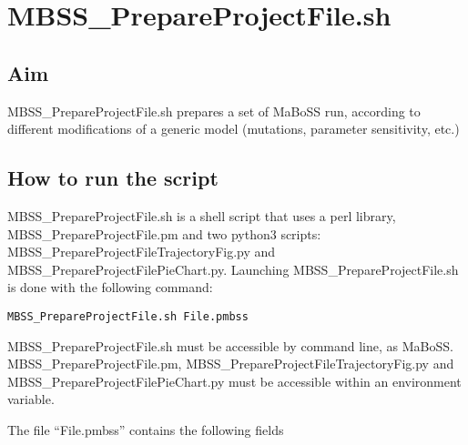 \documentclass{article}
\begin{document}
\section*{MBSS\_PrepareProjectFile.sh}
\subsection*{Aim}
MBSS\_PrepareProjectFile.sh prepares a set of MaBoSS run, according to different modifications of a generic model (mutations, parameter sensitivity, etc.)

\subsection*{How to run the script}
MBSS\_PrepareProjectFile.sh is a shell script that uses a perl library, MBSS\_PrepareProjectFile.pm and two python3 scripts: MBSS\_PrepareProjectFileTrajectoryFig.py and MBSS\_PrepareProjectFilePieChart.py.
Launching MBSS\_PrepareProjectFile.sh is done with the following command:
\begin{verbatim}
MBSS_PrepareProjectFile.sh File.pmbss
\end{verbatim}

MBSS\_PrepareProjectFile.sh must be accessible by command line, as MaBoSS. MBSS\_PrepareProjectFile.pm, MBSS\_PrepareProjectFileTrajectoryFig.py and MBSS\_PrepareProjectFilePieChart.py
must be accessible within an environment variable.

The file ``File.pmbss'' contains the following fields
\end{document}
